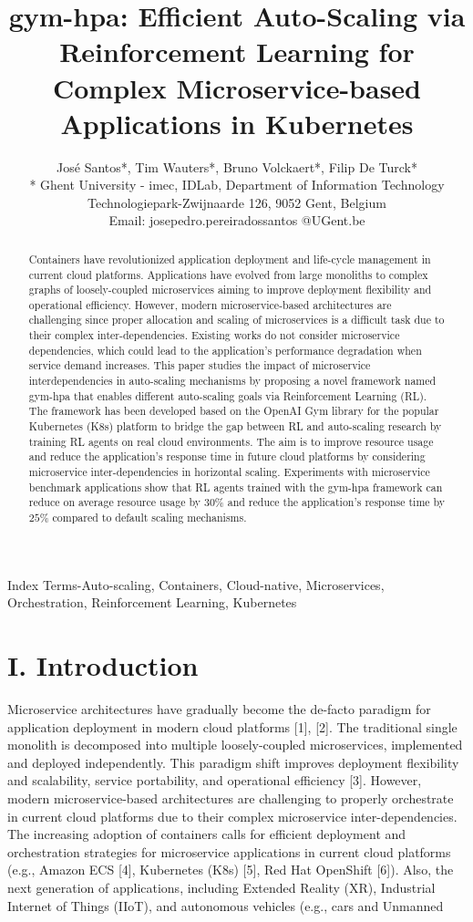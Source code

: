 \documentclass[10pt]{article}
\title{gym-hpa: Efficient Auto-Scaling via Reinforcement Learning for Complex Microservice-based Applications in Kubernetes }
\author{José Santos*, Tim Wauters*, Bruno Volckaert*, Filip De Turck*\\
* Ghent University - imec, IDLab, Department of Information Technology\\
Technologiepark-Zwijnaarde 126, 9052 Gent, Belgium\\
Email: josepedro.pereiradossantos @UGent.be}
\date{}
\begin{document}
\maketitle


\begin{abstract}
Containers have revolutionized application deployment and life-cycle management in current cloud platforms. Applications have evolved from large monoliths to complex graphs of loosely-coupled microservices aiming to improve deployment flexibility and operational efficiency. However, modern microservice-based architectures are challenging since proper allocation and scaling of microservices is a difficult task due to their complex inter-dependencies. Existing works do not consider microservice dependencies, which could lead to the application's performance degradation when service demand increases. This paper studies the impact of microservice interdependencies in auto-scaling mechanisms by proposing a novel framework named gym-hpa that enables different auto-scaling goals via Reinforcement Learning (RL). The framework has been developed based on the OpenAI Gym library for the popular Kubernetes (K8s) platform to bridge the gap between RL and auto-scaling research by training RL agents on real cloud environments. The aim is to improve resource usage and reduce the application's response time in future cloud platforms by considering microservice inter-dependencies in horizontal scaling. Experiments with microservice benchmark applications show that RL agents trained with the gym-hpa framework can reduce on average resource usage by $30 \%$ and reduce the application's response time by $25 \%$ compared to default scaling mechanisms.
\end{abstract}

Index Terms-Auto-scaling, Containers, Cloud-native, Microservices, Orchestration, Reinforcement Learning, Kubernetes

\section*{I. Introduction}
Microservice architectures have gradually become the de-facto paradigm for application deployment in modern cloud platforms [1], [2]. The traditional single monolith is decomposed into multiple loosely-coupled microservices, implemented and deployed independently. This paradigm shift improves deployment flexibility and scalability, service portability, and operational efficiency [3]. However, modern microservice-based architectures are challenging to properly orchestrate in current cloud platforms due to their complex microservice inter-dependencies. The increasing adoption of containers calls for efficient deployment and orchestration strategies for microservice applications in current cloud platforms (e.g., Amazon ECS [4], Kubernetes (K8s) [5], Red Hat OpenShift [6]). Also, the next generation of applications, including Extended Reality (XR), Industrial Internet of Things (IIoT), and autonomous vehicles (e.g., cars and Unmanned
\end{document}
